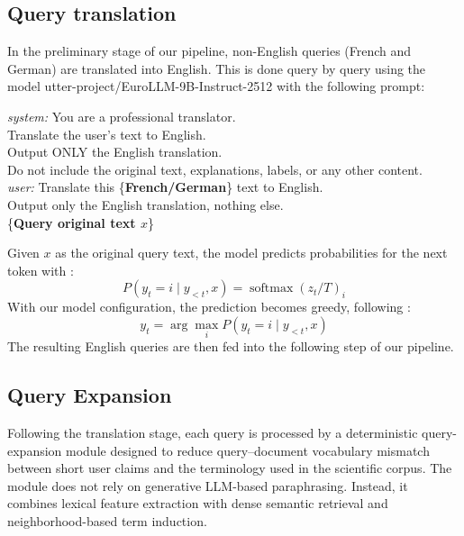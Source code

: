 \subsection{Query translation} \label{sub:querytransl}
In the preliminary stage of our pipeline, non-English queries (French and German) are translated into English. This is done query by query using the model utter-project/EuroLLM-9B-Instruct-2512 with the following prompt:
\begin{promptbox}
    \small
    \ttfamily
    \begin{flushleft}
        \textit{system:} You are a professional translator.\\
        Translate the user's text to English.\\
        Output ONLY the English translation.\\
        Do not include the original text, explanations, labels, or any other content.\\[0.8em]

        \textit{user:} Translate this \{\textbf{French/German}\} text to English.\\
        Output only the English translation, nothing else.\\[0.8em]

        \{\textbf{Query original text $x$}\}
    \end{flushleft}
\end{promptbox}
Given $x$ as the original query text, the model predicts probabilities for the next token with \cite{huggingface_transformers_generation}:
$$P(y_t=i\mid y_{<t},x)=\operatorname{softmax}(z_t/T)_i$$
With our model configuration, the prediction becomes greedy, following \cite{utter_project_eurollm_9b_instruct_2512}: $$y_t=\arg\max_i P(y_t=i\mid y_{<t},x)$$
The resulting English queries are then fed into the following step of our pipeline.

\subsection{Query Expansion} \label{sub:query-expansion}

Following the translation stage, each query is processed by a deterministic query-expansion module designed to reduce query–document vocabulary mismatch between short user claims and the terminology used in the scientific corpus. The module does not rely on generative LLM-based paraphrasing. Instead, it combines lexical feature extraction with dense semantic retrieval and neighborhood-based term induction. 

